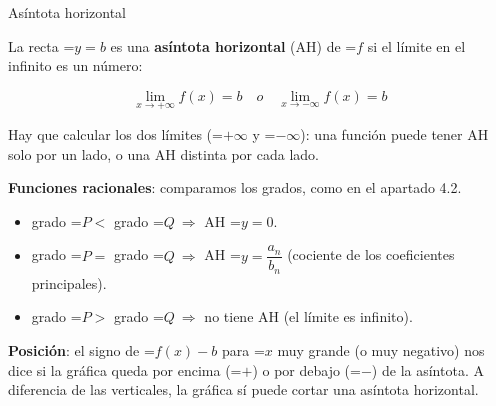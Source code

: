 \documentclass[11pt,a4paper]{article}
\newcommand{\lt}{<}\newcommand{\gt}{>}
\newcommand{\fmm}[1]{\setbox0=\hbox{$#1$}\ifdim\wd0>\linewidth\[#1\]\else\mbox{\box0}\fi}
\newcommand{\fmuline}[1]{\textbf{\color{fmaccent}#1}}
\begin{document}
  
\begin{fmdef}{Asíntota horizontal}
\par\noindent \begin{minipage}[t]{0.48\linewidth}\vspace{0pt}\raggedright La recta \fmm{y=b} es una \textbf{asíntota horizontal} (AH) de \fmm{f} si el límite en el infinito es un número:

          
\[\lim_{x\to+\infty}f(x)=b\quad o\quad\lim_{x\to-\infty}f(x)=b\]

          

Hay que calcular los dos límites (\fmm{+\infty} y \fmm{-\infty}): una función puede tener AH solo por un lado, o una AH distinta por cada lado.\end{minipage}\hfill\begin{minipage}[t]{0.48\linewidth}\vspace{0pt}\raggedright \begin{center}\end{center}\end{minipage}\par\medskip

      

\fmuline{Funciones racionales}: comparamos los grados, como en el apartado 4.2.

      
\begin{itemize}
\item grado \fmm{P\lt} grado \fmm{Q\ \Rightarrow} AH \fmm{y=0}.
\item grado \fmm{P=} grado \fmm{Q\ \Rightarrow} AH \fmm{y=\dfrac{a_n}{b_n}} (cociente de los coeficientes principales).
\item grado \fmm{P\gt} grado \fmm{Q\ \Rightarrow} no tiene AH (el límite es infinito).
\end{itemize}

      
\begin{fmnote}\fmuline{Posición}: el signo de \fmm{f(x)-b} para \fmm{x} muy grande (o muy negativo) nos dice si la gráfica queda por encima (\fmm{+}) o por debajo (\fmm{-}) de la asíntota. A diferencia de las verticales, la gráfica sí puede cortar una asíntota horizontal.\end{fmnote}
\end{fmdef}
\end{document}
